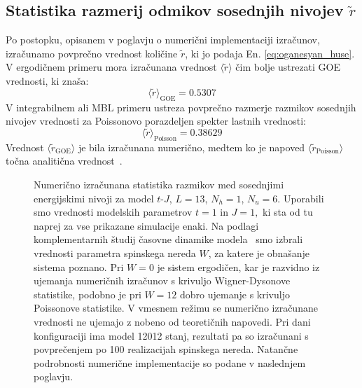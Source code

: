  \subsection{Statistika razmerij odmikov sosednjih nivojev $\tilde{r}$}
 \label{statistika_razmerij_odmikov}
 Po postopku, opisanem v poglavju o numerični implementaciji izračunov, izračunamo povprečno vrednost količine $\tilde{r}$, ki jo podaja En. \eqref{eq:oganesyan_huse}. V ergodičnem primeru mora izračunana vrednost $\langle \tilde{r}\rangle$ čim bolje ustrezati GOE vrednosti, ki znaša:
 \begin{equation}\label{eq:r_GOE}
 \langle \tilde{r}\rangle_\mathrm{GOE}=0.5307
 \end{equation}
 V integrabilnem ali MBL primeru ustreza povprečno razmerje razmikov sosednjih nivojev vrednosti za Poissonovo porazdeljen spekter lastnih vrednosti: 
 \begin{equation}\label{eq:r_poisson}
 \langle \tilde{r}\rangle_\mathrm{Poisson}=0.38629
 \end{equation}
Vrednost $\langle \tilde{r}_\mathrm{GOE}\rangle$ je bila izračunana numerično, medtem ko je napoved $\langle\tilde{r}_\mathrm{Poisson}\rangle$ točna analitična vrednost~\cite{Atas_Distribution_PhysRevLett.110.084101}.
\begin{figure}[H]
\caption{Numerično izračunana statistika razmikov med sosednjimi energijskimi nivoji za model $t$-$J$, $L=13$, $N_h=1$, $N_u=6$. Uporabili smo vrednosti modelskih parametrov $t=1$ in $J=1,$ ki sta od tu naprej za vse prikazane simulacije enaki. Na podlagi komplementarnih študij časovne dinamike modela~\cite{lemut2017complete} smo izbrali vrednosti parametra spinskega nereda $W$, za katere je obnašanje sistema poznano. Pri $W=0$ je sistem ergodičen, kar je razvidno iz ujemanja numeričnih izračunov s krivuljo Wigner-Dysonove statistike, podobno je pri $W=12$ dobro ujemanje s krivuljo Poissonove statistike. V vmesnem režimu se numerično izračunane vrednosti ne ujemajo z nobeno od teoretičnih napovedi. Pri dani konfiguraciji ima model 12012 stanj, rezultati pa so izračunani s povprečenjem po 100 realizacijah spinskega nereda. Natančne podrobnosti numerične implementacije so podane v naslednjem poglavju.  }
\label{fig:unfolding_demo_three_slo}
\end{figure}
